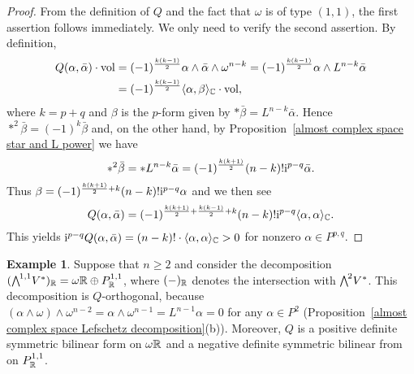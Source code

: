 \documentclass[11pt]{book}
\theoremstyle{definition}
\newtheorem{example}[theorem]{Example}
\begin{document}
\begin{proof}
From the definition of $Q$ and the fact that $\omega$ is of type $(1,1)$, the first assertion follows immediately. We only need to verify the second assertion. By definition,
\begin{align*}
Q(\alpha,\bar{\alpha})\cdot\mathrm{vol}&=(-1)^{\frac{k(k-1)}{2}}\alpha\wedge\bar{\alpha}\wedge\omega^{n-k}=(-1)^{\frac{k(k-1)}{2}}\alpha\wedge L^{n-k}\bar{\alpha}\\
&=(-1)^{\frac{k(k-1)}{2}}\langle\alpha,\beta\rangle_{\mathbb{C}}\cdot\mathrm{vol},
\end{align*}
where $k=p+q$ and $\beta$ is the $p$-form given by $\ast\bar{\beta}=L^{n-k}\bar{\alpha}$. Hence $\ast^2\bar{\beta}=(-1)^k\bar{\beta}$ and, on the other hand, by Proposition~\ref{almost complex space star and L power} we have
\[\ast^2\bar{\beta}=\ast L^{n-k}\bar{\alpha}=(-1)^{\frac{k(k+1)}{2}}(n-k)!\mathrm{i}^{p-q}\bar{\alpha}.\]
Thus $\beta=(-1)^{\frac{k(k+1)}{2}+k}(n-k)!\mathrm{i}^{p-q}\alpha$ and we then see
\[Q(\alpha,\bar{\alpha})=(-1)^{\frac{k(k+1)}{2}+\frac{k(k-1)}{2}+k}(n-k)!\mathrm{i}^{p-q}\langle\alpha,\alpha\rangle_{\mathbb{C}}.\]
This yields $\mathrm{i}^{p-q}Q(\alpha,\bar{\alpha})=(n-k)!\cdot\langle\alpha,\alpha\rangle_{\mathbb{C}}>0$ for nonzero $\alpha\in P^{p,q}$.
\end{proof}
\begin{example}
Suppose that $n\geq 2$ and consider the decomposition $(\bigw^{1,1}V^*)_{\R}=\omega\R\oplus P^{1,1}_{\R}$, where $(-)_{\mathbb{R}}$ denotes the intersection with $\bigw^2V^*$. This decomposition is $Q$-orthogonal, because $(\alpha\wedge\omega)\wedge\omega^{n-2}=\alpha\wedge\omega^{n-1}=L^{n-1}\alpha=0$ for any $\alpha\in P^2$ (Proposition~\ref{almost complex space Lefschetz decomposition}(b)). Moreover, $Q$ is a positive definite symmetric bilinear form on $\omega\mathbb{R}$ and a negative definite symmetric bilinear from on $P^{1,1}_{\mathbb{R}}$.
\end{example}
\end{document}
